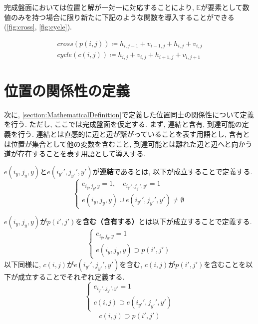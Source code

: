 完成盤面においては位置と解が一対一に対応することにより, $\mathbb{E}$が要素として数値のみを持つ場合に限り新たに下記のような関数を導入することができる(\cref{fig:cross}, \cref{fig:cycle}).

\begin{definition}\label{definition:Function}
  \begin{gather*}
    \textit{cross}(p(i,j))\coloneqq h_{i,j-1}+v_{i-1,j}+h_{i,j}+v_{i,j} \\
    \textit{cycle}(c(i,j))\coloneqq h_{i,j}+v_{i,j}+h_{i+1,j}+v_{i,j+1}
  \end{gather*}
\end{definition}




\section{位置の関係性の定義}\label{section:RelationDefinition}

次に, \cref{section:MathematicalDefinition}で定義した位置同士の関係性について定義を行う. ただし, ここでは完成盤面を仮定する.
まず, 連結と含有, 到達可能の定義を行う.
連結とは直感的に辺と辺が繋がっていることを表す用語とし, 含有とは位置が集合として他の変数を含むこと, 到達可能とは離れた辺と辺へと向かう道が存在することを表す用語として導入する.

\begin{definition}[連結]\label{definition:Connection}
  $e(i_y,j_y,y)$と$e(i_{y'}',j_{y'}',y')$が\textbf{連結}であるとは, 以下が成立することで定義する.
  \begin{equation*}
    \begin{cases}
      {e_{i_y,j_y,y}=1,\quad e_{i_{y'}',j_{y'}',y'}  =     1          } \\
      {e(i_y,j_y,y)\cup e(i_{y'}',j_{y'}',y')  \neq  \emptyset}
    \end{cases}
  \end{equation*}
\end{definition}

\begin{definition}[含有]\label{definition:Contain}
  $e(i_y,j_y,y)$が$p(i',j')$を\textbf{含む（含有する）}とは以下が成立することで定義する.
  \begin{equation*}
    \begin{cases}
      {e_{i_y,j_y,y}=1               } \\
      {e(i_y,j_y,y)\supset p(i',j')}
    \end{cases}
  \end{equation*}
  以下同様に, $c(i,j)$が$e(i_{y'}',j_{y'}',y')$を含む, $c(i,j)$が$p(i',j')$を含むことを以下が成立することでそれぞれ定義する.
  \begin{equation*}
    \begin{cases}
      {e_{i_{y'}',j_{y'}',y'}=1 } \\
      {c(i,j)\supset e(i_{y'}',j_{y'}',y')}
    \end{cases}
  \end{equation*}
  \begin{align*}
    c(i,j)\supset p(i',j')
  \end{align*}
\end{definition}


